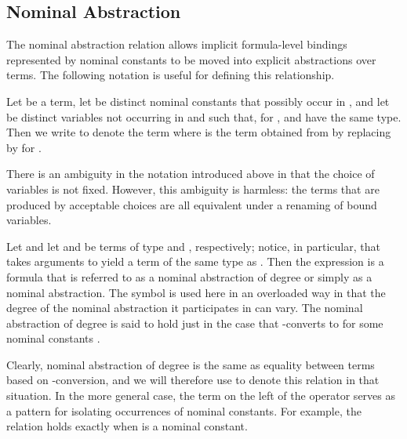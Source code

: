 \subsection{Nominal Abstraction}

The nominal abstraction relation allows implicit formula-level
bindings represented by nominal constants to be moved into explicit
abstractions over terms. The following notation is useful for
defining this relationship.

\begin{notation}
Let  be a term, let  be distinct nominal constants that
possibly occur in , and let  be distinct variables
not occurring in  and such that, for ,  and
 have the same type. Then we write  to denote the term  where  is the term obtained from  by replacing
 by  for .
\end{notation}

There is an ambiguity in the notation introduced above in that
the choice of variables  is not fixed. However, this
ambiguity is harmless: the terms that are produced by acceptable
choices are all equivalent under a renaming of bound variables.

\begin{definition}\label{nominal-abstraction}
Let  and
let  and  be terms of type  and , respectively; notice, in particular, that  takes
 arguments to yield a term of the same type as .
Then the expression  is a formula that is referred to as a
nominal abstraction of degree  or simply as a nominal abstraction. The
symbol  is used here in an overloaded way in that the degree
of the nominal abstraction it participates in can vary.
The nominal abstraction  of degree  is said to hold just in
the case that  -converts to  for
some nominal constants .
\end{definition}

Clearly, nominal abstraction of degree  is the same as equality
between terms based on -conversion, and we will therefore use
  to denote this relation in that situation. In the more general
case,
the term on the left of the operator serves as a pattern for isolating
occurrences of nominal constants. For example, the relation  holds exactly when  is a nominal constant.



